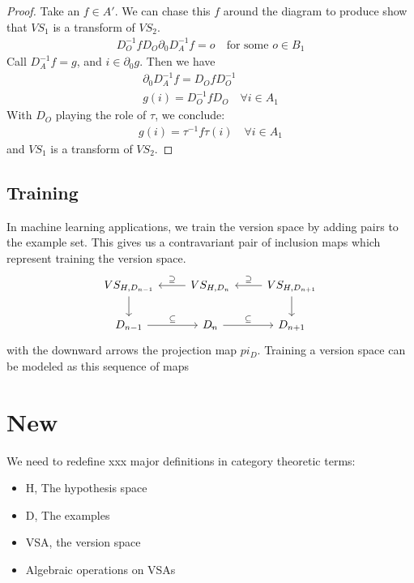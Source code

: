 \documentclass{article}
\theoremstyle{definition}
\begin{document}
\begin{proof}
Take an $f\in A'$. We can chase this $f$ around the diagram to produce show that $VS_1$ is a transform of $VS_2$. 
\begin{gather*}
    D_O^{-1} f D_O \partial_0 D_{A}^{-1} f = o \quad \text{for some $o \in B_1$}
\end{gather*}
Call $D^{-1}_A f = g$, and $i \in \partial_0 g$. Then we have 
\begin{gather*}
    \partial_0 D_A^{-1} f = D_O f D_O^{-1} \\
    g(i) = D_O^{-1} f D_O \quad \forall i \in A_1 
\end{gather*}
With $D_O$ playing the role of $\tau$, we conclude: 
\begin{gather*}
    g(i) = \tau^{-1} f \tau(i) \quad \forall i \in A_1
\end{gather*}
and $VS_1$ is a transform of $VS_2$. 
\end{proof}

\subsection{Training}
In machine learning applications, we train the version space by adding pairs to the example set. This gives us a contravariant pair of inclusion maps which represent training the version space. 
\[\begin{tikzcd}
	{VS_{H,D_{n-1}}} & {VS_{H,D_n}} & {VS_{H,D_{n+1}}} \\
	{D_{n-1}} & {D_n} & {D_{n+1}}
	\arrow["\supseteq"', from=1-3, to=1-2]
	\arrow["\subseteq", from=2-2, to=2-3]
	\arrow[from=2-2, to=2-2]
	\arrow[from=1-3, to=2-3]
	\arrow["\supseteq"', from=1-2, to=1-1]
	\arrow["\subseteq", from=2-1, to=2-2]
	\arrow[from=1-1, to=2-1]
\end{tikzcd}\]
with the downward arrows the projection map $pi_D$. Training a version space can be modeled as this sequence of maps

\section{New}
We need to redefine xxx major definitions in category theoretic terms: 
\begin{itemize}
    \item H, The hypothesis space
    \item D, The examples
    \item VSA, the version space
    \item Algebraic operations on VSAs
\end{itemize}
\end{document}
